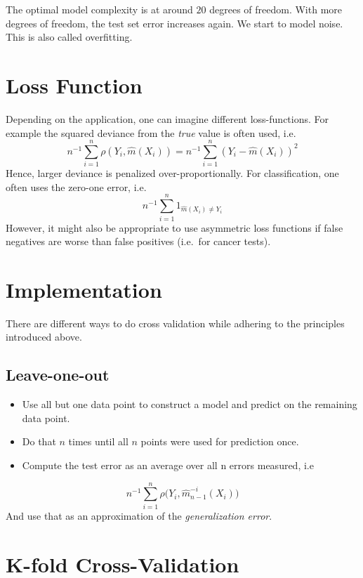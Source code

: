 \documentclass[]{book}
\providecommand{\tightlist}{%
  \setlength{\itemsep}{0pt}\setlength{\parskip}{0pt}}
\begin{document}
The optimal model complexity is at around \(20\) degrees of freedom.
With more degrees of freedom, the test set error increases again. We
start to model noise. This is also called overfitting.

\section{Loss Function}\label{loss-function}

Depending on the application, one can imagine different loss-functions.
For example the squared deviance from the \emph{true} value is often
used, i.e.
\[n^{-1}\sum\limits_{i = 1}^n\rho(Y_i, \hat{m}(X_i)) = n^{-1}\sum\limits_{i = 1}^n(Y_i - \hat{m}(X_i))^2\]
Hence, larger deviance is penalized over-proportionally. For
classification, one often uses the zero-one error, i.e.
\[n^{-1}\sum\limits_{i = 1}^n1_{\hat{m}(X_i) \neq Y_i}\] However, it
might also be appropriate to use asymmetric loss functions if false
negatives are worse than false positives (i.e.~for cancer tests).

\section{Implementation}\label{implementation}

There are different ways to do cross validation while adhering to the
principles introduced above.

\subsection{Leave-one-out}\label{leave-one-out}

\begin{itemize}
\tightlist
\item
  Use all but one data point to construct a model and predict on the
  remaining data point.
\item
  Do that \(n\) times until all \(n\) points were used for prediction
  once.
\item
  Compute the test error as an average over all n errors measured, i.e
\end{itemize}

\[n^{-1}\sum\limits_{i = 1}^n \rho{(Y_{i}, \hat{m}_{n-1}^{-i}(X_i)})\]
And use that as an approximation of the \emph{generalization error}.

\section{K-fold Cross-Validation}\label{k-fold-cross-validation}
\end{document}
